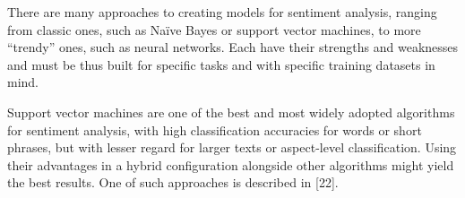 \documentclass[12pt,journal,compsoc]{IEEEtran}
\begin{document}
There are many approaches to creating models for sentiment analysis, ranging from classic ones, such as Naïve Bayes or support vector machines, to more “trendy” ones, such as neural networks. Each have their strengths and weaknesses and must be thus built for specific tasks and with specific training datasets in mind.

Support vector machines are one of the best and most widely adopted algorithms for sentiment analysis, with high classification accuracies for words or short phrases, but with lesser regard for larger texts or aspect-level classification. Using their advantages in a hybrid configuration alongside other algorithms might yield the best results. One of such approaches is described in [22].


\newpage  %

\appendices
\end{document}

